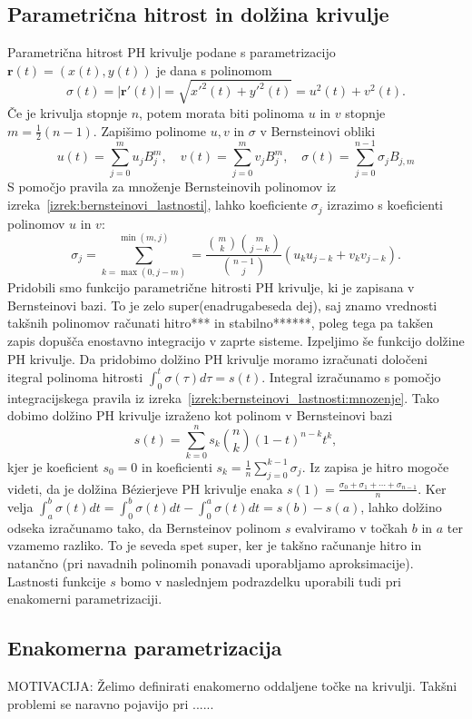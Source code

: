 \documentclass[isrm2, tisk]{fmfdelo}
\begin{document}
    \subsection{Parametrična hitrost in dolžina krivulje}

    Parametrična hitrost PH krivulje podane s parametrizacijo $\mathbf{r}(t)=(x(t),y(t))$ je dana s polinomom
    \[\sigma(t) = |\mathbf{r}'(t)| = \sqrt{x'^2(t)+y'^2(t)} = u^2(t)+v^2(t).\]
    Če je krivulja stopnje $n$, potem morata biti polinoma $u$ in $v$ stopnje $m=\frac{1}{2}(n-1)$.
    Zapišimo polinome $u,v$ in $\sigma$ v Bernsteinovi obliki \[u(t)=\sum_{j=0}^{m}u_j B_{j}^{m}, \quad v(t)=\sum_{j=0}^{m}v_j B_{j}^{m}, \quad \sigma(t)=\sum_{j=0}^{n-1}\sigma_j B_{j,m}\]
    S pomočjo pravila za množenje Bernsteinovih polinomov iz izreka~\ref{izrek:bernsteinovi_lastnosti}, lahko koeficiente $\sigma_j$ izrazimo s koeficienti polinomov $u$ in $v$:
    \[\sigma_j = \sum_{k=\max(0,j-m)}^{\min(m,j)} = \frac{\binom{m}{k}\binom{m}{j-k}}{\binom{n-1}{j}}(u_k u_{j-k}+v_k v_{j-k}).\]
    Pridobili smo funkcijo parametrične hitrosti PH krivulje, ki je zapisana v Bernsteinovi bazi.
    To je zelo super(enadrugabeseda dej), saj znamo vrednosti takšnih polinomov računati hitro*** in stabilno******, poleg tega pa takšen zapis dopušča enostavno integracijo v zaprte sisteme.
    Izpeljimo še funkcijo dolžine PH krivulje.
    Da pridobimo dolžino PH krivulje moramo izračunati določeni itegral polinoma hitrosti $\int_0^t\sigma(\tau)d\tau=s(t)$.
    Integral izračunamo s pomočjo integracijskega pravila iz izreka~\ref{izrek:bernsteinovi_lastnosti:mnozenje}.
    Tako dobimo dolžino PH krivulje izraženo kot polinom v Bernsteinovi bazi
    \[s(t)=\sum_{k=0}^n s_k \binom{n}{k}(1-t)^{n-k}t^k,\]
    kjer je koeficient $s_0=0$ in koeficienti $s_k = \frac{1}{n}\sum^{k-1}_{j=0}\sigma_j$.
    Iz zapisa je hitro mogoče videti, da je dolžina Bézierjeve PH krivulje enaka $s(1)=\frac{\sigma_0+\sigma_1+\cdots+\sigma_{n-1}}{n}$.
    Ker velja $\int_a^b \sigma(t)dt = \int_0^b\sigma(t)dt - \int_0^a\sigma(t)dt = s(b)-s(a)$, lahko dolžino odseka izračunamo tako, da Bernsteinov polinom $s$ evalviramo v točkah $b$ in $a$ ter vzamemo razliko.
    To je seveda spet super, ker je takšno računanje hitro in natančno (pri navadnih polinomih ponavadi uporabljamo aproksimacije).
    Lastnosti funkcije $s$ bomo v naslednjem podrazdelku uporabili tudi pri enakomerni parametrizaciji.

    \subsection{Enakomerna parametrizacija}
    MOTIVACIJA: Želimo definirati enakomerno oddaljene točke na krivulji. Takšni problemi se naravno pojavijo pri ...... \newline
\end{document}
